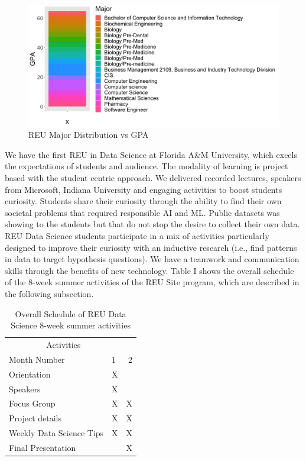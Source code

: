 \documentclass[10pt, a4paper, twocolumn]{article} %
\begin{document}
\begin{figure}
	\includegraphics[width=\linewidth]{major1.jpeg} %
	\caption{REU Major Distribution vs GPA} %
	\label{major} %
\end{figure}

We have the first REU in Data Science at Florida A\&M University, which excels the expectations of students and audience. The modality of learning is project based with the student centric approach. We delivered recorded lectures, speakers from Microsoft, Indiana University and engaging activities to boost students curiosity. Students share their curiosity through the ability to find their own societal problems that required responsible AI and ML. Public datasets was showing to the students but that do not stop the desire to collect their own data. REU Data Science students participate in a mix of activities particularly designed to improve their curiosity with an inductive research (i.e., find patterns in data to target hypothesis questions). We have a teamwork and communication skills through the benefits of new technology. Table I shows the overall schedule of the 8-week summer activities of the REU Site program, which are described in the following subsection.

\begin{table}
	\caption{Overall Schedule of REU Data Science 8-week summer activities}
	\centering
	\begin{tabular}{llr}
		\toprule
		\multicolumn{2}{c}{Activities} \\
		\cmidrule(r){1-2}
		Month Number & 1 & 2  \\
		\midrule
		Orientation & X &  \\
		Speakers & X &  \\
		Focus Group & X & X \\
		Project details & X & X \\
		Weekly Data Science Tips & X & X \\
		Final Presentation &  & X \\
		\bottomrule
	\end{tabular}
\end{table}
\end{document}
